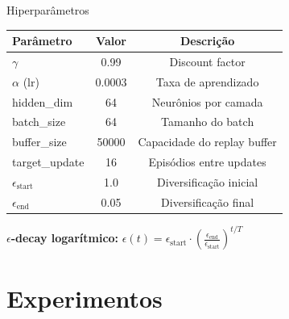 \documentclass[11pt, xcolor=dvipsnames]{beamer}
\begin{document}
\begin{frame}{Hiperparâmetros}
  \footnotesize
  \centering
  \renewcommand{\arraystretch}{1.2}
  \begin{tabular}{lcc}
    \toprule
    \textbf{Parâmetro} & \textbf{Valor} & \textbf{Descrição} \\
    \midrule
    $\gamma$ & 0.99 & Discount factor \\
    $\alpha$ (lr) & 0.0003 & Taxa de aprendizado \\
    hidden\_dim & 64 & Neurônios por camada \\
    batch\_size & 64 & Tamanho do batch \\
    buffer\_size & 50000 & Capacidade do replay buffer \\
    target\_update & 16 & Episódios entre updates \\
    $\epsilon_{\text{start}}$ & 1.0 & Diversificação inicial \\
    $\epsilon_{\text{end}}$ & 0.05 & Diversificação final \\
    \bottomrule
  \end{tabular}
  \vspace{3mm}

  \begin{calloutbox}
    {\scriptsize
    \textbf{$\epsilon$-decay logarítmico:} $\epsilon(t) = \epsilon_{\text{start}} \cdot \left(\frac{\epsilon_{\text{end}}}{\epsilon_{\text{start}}}\right)^{t/T}$
    }
  \end{calloutbox}
\end{frame}

\section{Experimentos}
\end{document}
